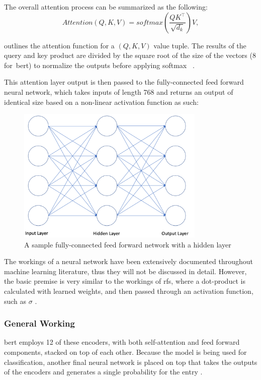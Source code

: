 \documentclass[12pt]{article}
\begin{document}
The overall attention process can be summarized as the following:
\begin{equation}
\label{eq:attention}
Attention\left(Q, K, V\right) = softmax\left(\frac{QK^\top}{\sqrt{d_k}}\right)V, 
\end{equation}

 outlines the attention function for a $(Q,K,V)$ value tuple. The results of the query and key product are divided by the square root of the size of the vectors (8 for~\acrshort{bert}) to normalize the outputs before applying softmax ~\parencite{transformers:}.

This attention layer output is then passed to the fully-connected feed forward neural network, which takes inputs of length 768 and returns an output of identical size based on a non-linear activation function as such:

\begin{figure}[H]
\centering
\includegraphics[width=0.8\textwidth]{fig/full_neural.png}
\caption{A sample fully-connected feed forward network with a hidden layer}
\label{fig:neural-network}
\end{figure}

The workings of a neural network have been extensively documented throughout machine learning literature, thus they will not be discussed in detail. However, the basic premise is very similar to the workings of \acrshort{rfs}, where a dot-product is calculated with learned weights, and then passed through an activation function, such as $\sigma$ \parencite{lecun2015deep}.

\subsubsection{General Working}
\acrshort{bert} employs 12 of these encoders, with both self-attention and feed forward components, stacked on top of each other. Because the model is being used for classification, another final neural network is placed on top that takes the outputs of the encoders and generates a single probability for the entry \parencite{sun2019finetune}.
\end{document}
